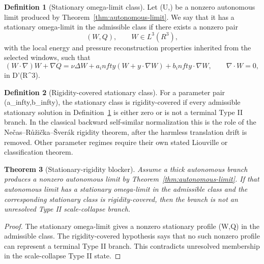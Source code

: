 \documentclass[11pt]{amsart}
\def\({}%
\def\){}%
\def\mathbb#1{#1}%
\def\infty{infty}%
\theoremstyle{plain}
\newtheorem{theorem}{Theorem}[section]
\theoremstyle{definition}
\newtheorem{definition}[theorem]{Definition}
\theoremstyle{remark}
\begin{document}
\begin{definition}[Stationary omega-limit class]\label{def:stationary-omega-class}
Let \((U,\Pi)\) be a nonzero autonomous limit produced by
Theorem~\ref{thm:autonomous-limit}.  We say that it has a stationary omega-limit in the
admissible class if there exists a nonzero pair
\[
  (W,Q),\qquad W\in L^3(\mathbb R^3),
\]
with the local energy and pressure reconstruction properties inherited from the selected
windows, such that
\[
  (W\cdot\nabla)W+\nabla Q
  =
  \nu\Delta W+a_\infty(W+y\cdot\nabla W)+b_\infty\cdot\nabla W,
  \qquad
  \nabla\cdot W=0,
\]
in \(\mathcal D'(\mathbb R^3)\).
\end{definition}

\begin{definition}[Rigidity-covered stationary class]\label{def:rigidity-covered-class}
For a parameter pair \((a_\infty,b_\infty)\), the stationary class is rigidity-covered if every
admissible stationary solution in Definition~\ref{def:stationary-omega-class} is either zero or
is not a terminal Type II branch.  In the classical backward self-similar normalization this is
the role of the Nečas--Růžička--Šverák rigidity theorem, after the harmless translation drift is
removed.  Other parameter regimes require their own stated Liouville or classification theorem.
\end{definition}

\begin{theorem}[Stationary-rigidity blocker]\label{thm:stationary-rigidity-blocker}
Assume a thick autonomous branch produces a nonzero autonomous limit by
Theorem~\ref{thm:autonomous-limit}.  If that autonomous limit has a stationary omega-limit in
the admissible class and the corresponding stationary class is rigidity-covered, then the branch
is not an unresolved Type II scale-collapse branch.
\end{theorem}

\begin{proof}
The stationary omega-limit gives a nonzero stationary profile \((W,Q)\) in the admissible class.
The rigidity-covered hypothesis says that no such nonzero profile can represent a terminal Type
II branch.  This contradicts unresolved membership in the scale-collapse Type II state.
\end{proof}
\end{document}
